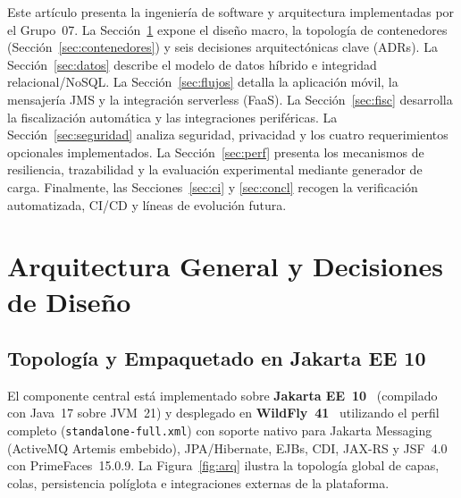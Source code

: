 \documentclass[11pt,a4paper,twocolumn]{article}
\begin{document}
Este artículo presenta la ingeniería de software y arquitectura implementadas por el Grupo~07. La Sección~\ref{sec:arq} expone el diseño macro, la topología de contenedores (Sección~\ref{sec:contenedores}) y seis decisiones arquitectónicas clave (ADRs). La Sección~\ref{sec:datos} describe el modelo de datos híbrido e integridad relacional/NoSQL. La Sección~\ref{sec:flujos} detalla la aplicación móvil, la mensajería JMS y la integración serverless (FaaS). La Sección~\ref{sec:fisc} desarrolla la fiscalización automática y las integraciones periféricas. La Sección~\ref{sec:seguridad} analiza seguridad, privacidad y los cuatro requerimientos opcionales implementados. La Sección~\ref{sec:perf} presenta los mecanismos de resiliencia, trazabilidad y la evaluación experimental mediante generador de carga. Finalmente, las Secciones~\ref{sec:ci} y \ref{sec:concl} recogen la verificación automatizada, CI/CD y líneas de evolución futura.

\section{Arquitectura General y Decisiones de Diseño}\label{sec:arq}

\subsection{Topología y Empaquetado en Jakarta EE 10}

El componente central está implementado sobre \textbf{Jakarta EE~10}~\cite{jakarta} (compilado con Java~17 sobre JVM~21) y desplegado en \textbf{WildFly~41}~\cite{wildfly} utilizando el perfil completo (\texttt{standalone-full.xml}) con soporte nativo para Jakarta Messaging (ActiveMQ Artemis embebido), JPA/Hibernate, EJBs, CDI, JAX-RS y JSF~4.0 con PrimeFaces~15.0.9. La Figura~\ref{fig:arq} ilustra la topología global de capas, colas, persistencia políglota e integraciones externas de la plataforma.
\end{document}
